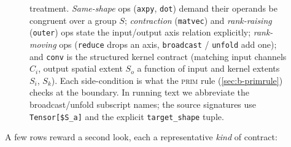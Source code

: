 \begin{figure}[t]
{treatment. \emph{Same-shape} ops (\lstinline[style=l4style]|axpy|,
\lstinline[style=l4style]|dot|) demand their operands be congruent over a group
$S$; \emph{contraction} (\lstinline[style=l4style]|matvec|) and
\emph{rank-raising} (\lstinline[style=l4style]|outer|) ops state the input/output
axis relation explicitly; \emph{rank-moving} ops
(\lstinline[style=l4style]|reduce| drops an axis,
\lstinline[style=l4style]|broadcast| / \lstinline[style=l4style]|unfold| add one);
and \lstinline[style=l4style]|conv| is the structured kernel contract (matching
input channels $C_i$, output spatial extent $S_o$ a function of input and kernel
extents $S_i$, $S_k$). Each side-condition is what the \textsc{prim} rule
(\cref{sec:b-primrule}) checks at the boundary. In running text we abbreviate the
broadcast/unfold subscript names; the source signatures use
\lstinline[style=l4style]!Tensor[$S_a]! and the explicit \texttt{target\_shape}
tuple.}
\label{fig:b-contracts}
\end{figure}

A few rows reward a second look, each a representative \emph{kind} of contract:

